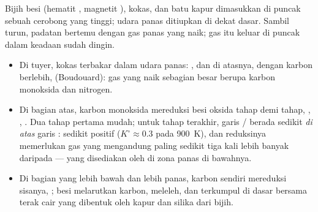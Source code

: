 Bijih besi (hematit , magnetit ), kokas, dan batu
kapur dimasukkan di puncak sebuah cerobong yang tinggi; udara panas
ditiupkan di dekat dasar. Sambil turun, padatan bertemu dengan gas panas
yang naik; gas itu keluar di puncak dalam keadaan sudah dingin.
\begin{itemize}
  \item Di tuyer, kokas terbakar dalam udara panas: , dan
        di atasnya, dengan karbon berlebih, 
        (Boudouard): gas yang naik sebagian besar berupa karbon monoksida
        dan nitrogen.
  \item Di bagian atas, karbon monoksida mereduksi besi oksida tahap demi
        tahap, , ,
        . Dua tahap pertama mudah; untuk tahap
        terakhir, garis / berada sedikit \textit{di atas}
        garis :  sedikit positif
        ($K^\circ \approx 0.3$ pada \qty{900}{K}), dan reduksinya
        memerlukan gas yang mengandung  paling sedikit tiga kali
        lebih banyak daripada  --- yang disediakan oleh
         di zona panas di bawahnya.
  \item Di bagian yang lebih bawah dan lebih panas, karbon sendiri
        mereduksi sisanya, ; besi melarutkan karbon,
        meleleh, dan terkumpul di dasar bersama terak cair yang dibentuk
        oleh kapur dan silika dari bijih.
\end{itemize}

